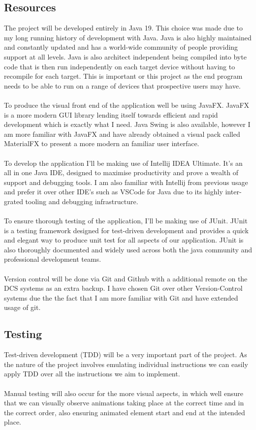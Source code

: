 \documentclass[a4paper,fleqn,12pt]{article}
\begin{document}
\subsection{Resources}
The project will be developed entirely in Java 19. This choice was made due to my long running history of development with Java. Java is also highly maintained and constantly updated and has a world-wide community of people providing support at all levels. Java is also architect independent being compiled into byte code that is then run independently on each target device without having to recompile for each target. This is important or this project as the end program needs to be able to run on a range of devices that prospective users may have.
\\\\
To produce the visual front end of the application well be using JavaFX. JavaFX is a more modern GUI library lending itself towards efficient and rapid development which is exactly what I need. Java Swing is also available, however I am more familiar with JavaFX and have already obtained a visual pack called MaterialFX to present a more modern an familiar user interface.
\\\\
To develop the application I'll be making use of Intellij IDEA Ultimate. It's an all in one Java IDE, designed to maximise productivity and prove a wealth of support and debugging tools. I am also familiar with Intellij from previous usage and prefer it over other IDE's such as VSCode for Java due to its highly inter-grated tooling and debugging infrastructure.
\\\\
To ensure thorough testing of the application, I'll be making use of JUnit. JUnit is a testing framework designed for test-driven development and provides a quick and elegant way to produce unit test for all aspects of our application. JUnit is also thoroughly documented and widely used across both the java community and professional development teams.
\\\\
Version control will be done via Git and Github with a additional remote on the DCS systems as an extra backup. I have chosen Git over other Version-Control systems due the the fact that I am more familiar with Git and have extended usage of git.

\subsection{Testing}
Test-driven development (TDD) will be a very important part of the project. As the nature of the project involves emulating individual instructions we can easily apply TDD over all the instructions we aim to implement.
\\\\
Manual testing will also occur for the more visual aspects, in which well ensure that we can visually observe animations taking place at the correct time and in the correct order, also ensuring animated element start and end at the intended place.
\end{document}
